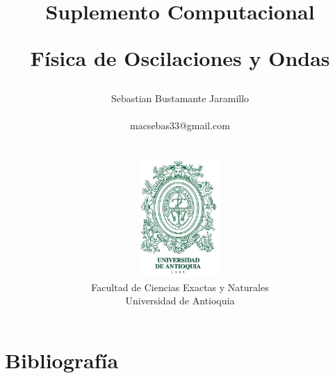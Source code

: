 \documentclass[12pt]{book}
\begin{document}
\title{Suplemento Computacional \\
\begin{Huge}
\textbf{Física de Oscilaciones y Ondas}
\end{Huge}}
\author{ Sebastian Bustamante Jaramillo\\ \begin{small}
macsebas33@gmail.com
\end{small} \\ \vspace{5cm} \\
\includegraphics[width=3cm]{pictures/UdeA_Shield} \\
Facultad de Ciencias Exactas y Naturales \\ 
Universidad de Antioquia }
\date{}
\maketitle



\newpage{\pagestyle{empty}\cleardoublepage}  

\tableofcontents
\newpage{\pagestyle{empty}\cleardoublepage}  








\chapter{Bibliografía}
\end{document}
